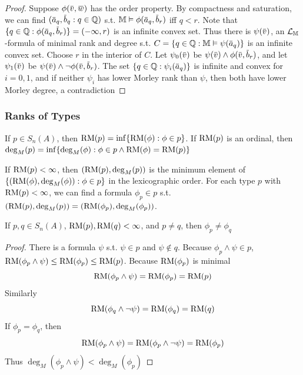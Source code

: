 \documentclass[11pt]{article}
\begin{document}
\begin{proof}
Suppose \(\phi(\barv,\barw)\) has the order property. By compactness and saturation, we can
find \((\bara_q,\barb_q:q\in\Q)\) s.t. \(\M\vDash\phi(\bara_q,\barb_r)\) iff \(q<r\).
Note that \(\{q\in\Q:\phi(\bara_q,\barb_r)\}=(-\infty,r)\) is an infinite convex set. Thus there
is \(\psi(\barv)\), an \(\mathcal{L}_{\mathbb{M}}\)-formula of minimal rank and degree s.t. \(C=\{q\in\Q:\M\vDash\psi(\bara_q)\}\)
is an infinite convex set.
Choose \(r\) in the interior of \(C\). Let \(\psi_0(\barv)\) be \(\psi(\barv)\wedge\phi(\barv,\barb_r)\), and
let \(\psi_1(\barv)\) be \(\psi(\barv)\wedge\neg\phi(\barv,\barb_r)\). The set \(\{q\in\Q:\psi_i(\bara_q)\}\) is infinite
and convex for \(i=0,1\), and if neither \(\psi_i\) has lower Morley rank than \(\psi\), then both have
lower Morley degree, a contradiction
\end{proof}
\subsubsection{Ranks of Types}
\label{sec:org9a294d3}
\begin{definition}[]
If \(p\in S_n(A)\), then \(\operatorname{RM}(p)=\inf\{\operatorname{RM}(\phi):\phi\in p\}\). If \(\operatorname{RM}(p)\) is an ordinal,
then \(\deg_M(p)=\inf\{\deg_M(\phi):\phi\in p\wedge\operatorname{RM}(\phi)=\operatorname{RM}(p)\}\)
\end{definition}

If \(\operatorname{RM}(p)<\infty\), then \((\operatorname{RM}(p),\deg_M(p))\) is the minimum element
of \(\{(\operatorname{RM}(\phi),\deg_M(\phi)):\phi\in p\}\) in the lexicographic order. For each type \(p\)
with \(\operatorname{RM}(p)<\infty\), we can find a formula \(\phi_p\in p\)
s.t. \((\operatorname{RM}(p),\deg_M(p))=(\operatorname{RM}(\phi_p),\deg_M(\phi_p))\).

\begin{lemma}[]
If \(p,q\in S_n(A)\), \(\operatorname{RM}(p),\operatorname{RM}(q)<\infty\), and \(p\neq q\), then \(\phi_p\neq\phi_q\)
\end{lemma}

\begin{proof}
There is a formula \(\psi\) s.t. \(\psi\in p\) and \(\psi\notin q\).
Because \(\phi_p\wedge\psi\in p\), \(\operatorname{RM}(\phi_p\wedge\psi)\le\operatorname{RM}(\phi_p)\le\operatorname{RM}(p)\). Because \(\operatorname{RM}(\phi_p)\) is minimal
\begin{equation*}
\operatorname{RM}(\phi_p\wedge\psi)=\operatorname{RM}(\phi_p)=\operatorname{RM}(p)
\end{equation*}
Similarly
\begin{equation*}
\operatorname{RM}(\phi_q\wedge\neg\psi)=\operatorname{RM}(\phi_q)=\operatorname{RM}(q)
\end{equation*}
If \(\phi_p=\phi_q\), then
\begin{equation*}
\operatorname{RM}(\phi_p\wedge\psi)=\operatorname{RM}(\phi_p\wedge\neg\psi)=\operatorname{RM}(\phi_p)
\end{equation*}
Thus \(\deg_M(\phi_p\wedge\psi)<\deg_M(\phi_p)\)
\end{proof}
\end{document}
